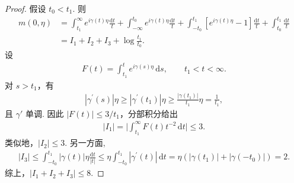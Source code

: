 \begin{proof}
假设 $t_{0} < t_{1}$. 则
\begin{align*}
  m(0,\eta)
  &=\int_{t_{1}}^{\infty}e^{i\gamma(t)\eta}\frac{\mathrm{d}t}{t}
   +\int_{-\infty}^{t_{0}}e^{i\gamma(t)\eta}\frac{\mathrm{d}t}{t}
   +\int_{-t_{0}}^{t_{1}}[e^{i\gamma(t)\eta}-1]\frac{\mathrm{d}t}{t}
   +\int_{t_{0}}^{t_{1}}\frac{\mathrm{d}t}{t}\\
  &=I_{1}+I_{2}+I_{3}+\log\frac{t_{1}}{t_{0}}.
\end{align*}
设
\begin{align*}
  F(t)=\int_{t_{1}}^{t}e^{i\gamma(s)\eta}\,\mathrm{d}s,\qquad t_{1}<t<\infty.
\end{align*}
对 $s > t_{1}$，有
\begin{align*}
  |\gamma^{\prime}(s)|\eta\geq|\gamma^{\prime}(t_{1})|\eta\geq\frac{|\gamma(t_{1})|}{t_{1}}\eta=\frac{1}{t_{1}},
\end{align*}
且 $\gamma'$ 单调. 因此 $|F(t)| \leq 3/t_1$，分部积分给出
\begin{align*}
  |I_{1}|=\Big|\int_{t_{1}}^{\infty}F(t)t^{-2}\,\mathrm{d}t\Big|\leq 3.
\end{align*}
类似地，$|I_2| \leq 3$. 另一方面,
\begin{align*}
  |I_{3}|\leq\int_{-t_{0}}^{t_{1}}|\gamma(t)|\eta\frac{\mathrm{d}t}{|t|}
  \leq\eta\int_{-t_{0}}^{t_{1}}|\gamma^{\prime}(t)|\,\mathrm{d}t
  =\eta(|\gamma(t_{1})|+|\gamma(-t_{0})|)=2.
\end{align*}
综上，$\left|I_{1}+I_{2}+I_{3}\right|\leq 8$.
\end{proof}

